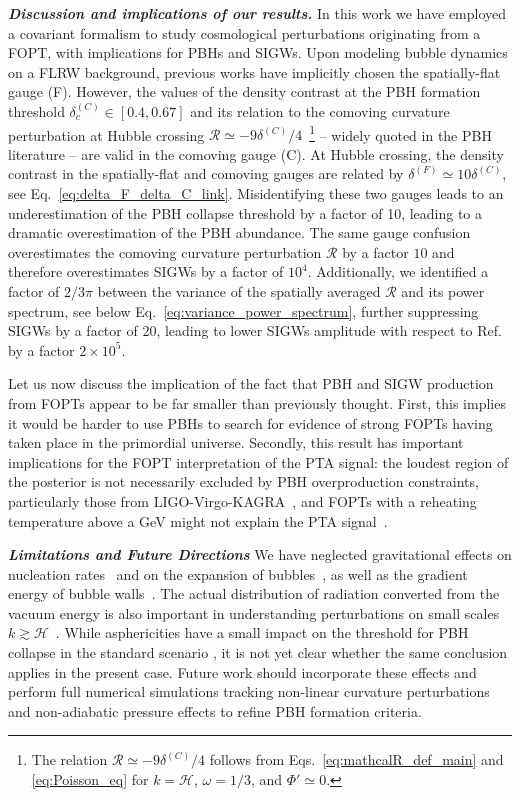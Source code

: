\documentclass[twocolumn,superscriptaddress,aps,preprintnumbers,amsmath,amssymb,prl,footinbib]{revtex4-2}
\begin{document}
{\textit{\textbf{ Discussion and implications of our results.}}}
In this work we have employed a covariant formalism to study cosmological perturbations originating from a FOPT, with implications for PBHs and SIGWs.
Upon modeling bubble dynamics on a FLRW background, previous works have implicitly chosen the spatially-flat gauge (F). However, the values of the density contrast at the PBH formation threshold $\delta^{(C)}_c\in[0.4,0.67]$ and its relation to the comoving curvature perturbation at Hubble crossing $\mathcal{R}\simeq -9\delta^{(C)}/4 $~\footnote{{The relation $\mathcal{R}\simeq -9\delta^{(C)}/4$ follows from Eqs.~\eqref{eq:mathcalR_def_main} and \eqref{eq:Poisson_eq} for $k=\mathcal{H}$, $\omega=1/3$, and $\Phi'\simeq 0$.}} -- widely quoted in the PBH literature -- are valid in the comoving gauge (C).
At Hubble crossing, the density contrast in the spatially-flat and comoving gauges are related by $\delta^{(F)} \simeq 10\delta^{(C)}$, {see Eq.~\eqref{eq:delta_F_delta_C_link}.}
Misidentifying these two gauges leads to an underestimation of the PBH collapse threshold by a factor of 10, leading to a dramatic overestimation of the PBH abundance.
The same gauge confusion overestimates the comoving curvature perturbation $\mathcal{R}$ by a factor $10$ and therefore overestimates SIGWs by a factor of $10^4$.
Additionally, we identified a factor of $2/3\pi$ between the variance of the spatially averaged $\mathcal{R}$ and its power spectrum, {see below Eq.~\eqref{eq:variance_power_spectrum},} further suppressing SIGWs by a factor of $20$, {leading to lower SIGWs amplitude with respect to Ref.~\cite{Lewicki:2024ghw} by a factor $2\times 10^5$.}

{Let us now discuss the implication of the fact that PBH and SIGW production from FOPTs appear to be far smaller than previously thought. First, this implies it would be harder to use PBHs to search for evidence of strong FOPTs having taken place in the primordial universe.
Secondly, this result has important implications for the FOPT interpretation of the PTA signal: the loudest region of the posterior is not necessarily excluded by PBH overproduction constraints, particularly those from LIGO-Virgo-KAGRA~\cite{Gouttenoire:2023bqy,Ellis:2023oxs,Lewicki:2024ghw}, and FOPTs with a reheating temperature above a GeV might not explain the PTA signal~\cite{Lewicki:2024ghw}.
}

{\textit{\textbf{Limitations and Future Directions}}}
We have neglected gravitational effects on nucleation rates~\cite{Coleman:1980aw} and on the expansion of bubbles~\cite{Giombi:2023jqq,Jinno:2024nwb}, as well as the gradient energy of bubble walls~\cite{Lewicki:2023ioy,Flores:2024lng,Hashino:2025fse}.
The actual distribution of radiation converted from the vacuum energy is also important in understanding perturbations on small scales $k \gtrsim \mathcal{H}$~\cite{Jinno:2019jhi,Lewicki:2022pdb}.
{While asphericities have a small impact on the threshold for PBH collapse in the standard scenario \cite{Yoo:2020lmg}, it is not yet clear whether the same conclusion applies in the present case.}
Future work should incorporate these effects and perform full numerical simulations tracking non-linear curvature perturbations and non-adiabatic pressure effects to refine PBH formation criteria.
\end{document}
